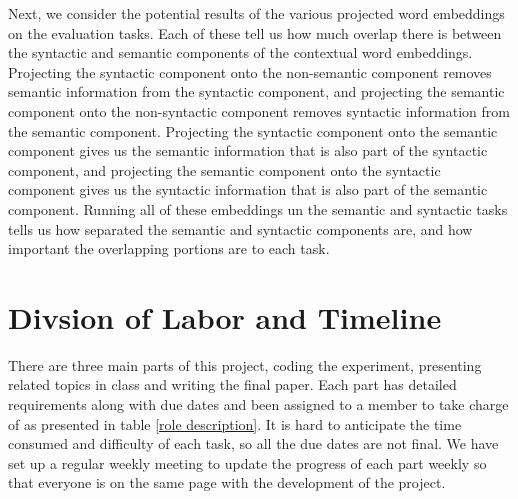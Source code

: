 \documentclass[11pt,a4paper]{article}
\begin{document}
Next, we consider the potential results of the various projected word embeddings on the evaluation tasks. Each of these tell us how much overlap there is between the syntactic and semantic components of the contextual word embeddings. Projecting the syntactic component onto the non-semantic component removes semantic information from the syntactic component, and projecting the semantic component onto the non-syntactic component removes syntactic information from the semantic component. Projecting the syntactic component onto the semantic component gives us the semantic information that is also part of the syntactic component, and projecting the semantic component onto the syntactic component gives us the syntactic information that is also part of the semantic component. Running all of these embeddings un the semantic and syntactic tasks tells us how separated the semantic and syntactic components are, and how important the overlapping portions are to each task.




\section{Divsion of Labor and Timeline}
\label{sec:management}
There are three main parts of this project, coding the experiment, presenting related topics in class and writing the final paper. Each part has detailed requirements along with due dates and been assigned to a member to take charge of as presented in table \ref{role description}. It is hard to anticipate the time consumed and difficulty of each task, so all the due dates are not final. We have set up a regular weekly meeting to update the progress of each part weekly so that everyone is on the same page with the development of the project. 
\end{document}
